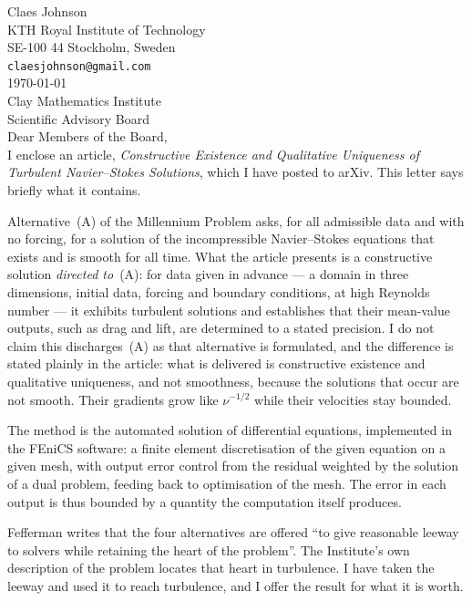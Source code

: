 \documentclass[11pt]{article}
\begin{document}
\noindent
Claes Johnson\\
KTH Royal Institute of Technology\\
SE-100 44 Stockholm, Sweden\\
\texttt{claesjohnson@gmail.com}\\[1.2em]
\today\\[1.6em]
%
\noindent
Clay Mathematics Institute\\
Scientific Advisory Board\\[1.8em]

\noindent Dear Members of the Board,\\[0.8em]

I enclose an article, \emph{Constructive Existence and Qualitative Uniqueness of Turbulent Navier--Stokes Solutions}, which I have
posted to arXiv. This letter says briefly what it contains.

Alternative~(A) of the Millennium Problem asks, for all admissible data and with no forcing, for a
solution of the incompressible Navier--Stokes equations that exists and is smooth for all time. What
the article presents is a constructive solution \emph{directed to}~(A): for data given in advance ---
a domain in three dimensions, initial data, forcing and boundary conditions, at high Reynolds number
--- it exhibits turbulent solutions and establishes that their mean-value outputs, such as drag and
lift, are determined to a stated precision. I do not claim this discharges~(A) as that alternative is
formulated, and the difference is stated plainly in the article: what is delivered is constructive
existence and qualitative uniqueness, and not smoothness, because the solutions that occur are not
smooth. Their gradients grow like $\nu^{-1/2}$ while their velocities stay bounded.

The method is the automated solution of differential equations, implemented in the FEniCS software:
a finite element discretisation of the given equation on a given mesh, with output error control from
the residual weighted by the solution of a dual problem, feeding back to optimisation of the mesh.
The error in each output is thus bounded by a quantity the computation itself produces.

Fefferman writes that the four alternatives are offered ``to give reasonable leeway to solvers while
retaining the heart of the problem''. The Institute's own description of the problem locates that
heart in turbulence. I have taken the leeway and used it to reach turbulence, and I offer the result
for what it is worth.
\end{document}
